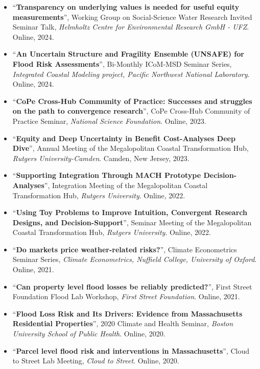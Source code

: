 \documentclass[10pt,oneside]{article}
\begin{document}
\begin{itemize}[label={}]
  \item \enquote{\textbf{Transparency on underlying values is needed for useful equity measurements}}, Working Group on Social-Science Water Research Invited Seminar Talk,  \textit{Helmholtz Centre for Environmental Research GmbH - UFZ}. Online, 2024.
  
  \item \enquote{\textbf{An Uncertain Structure and Fragility Ensemble (UNSAFE) for Flood Risk Assessments}}, Bi-Monthly ICoM-MSD Seminar Series,  \textit{Integrated Coastal Modeling project, Pacific Northwest National Laboratory}. Online, 2024.
  
  \item \enquote{\textbf{CoPe Cross-Hub Community of Practice: Successes and struggles on the path to convergence research}}, CoPe Cross-Hub Community of Practice Seminar,  \textit{National Science Foundation}. Online, 2023.
  
  \item \enquote{\textbf{Equity and Deep Uncertainty in Benefit Cost-Analyses Deep Dive}}, Annual Meeting of the Megalopolitan Coastal Transformation Hub,  \textit{Rutgers University-Camden}. Camden, New Jersey, 2023.
  
  \item \enquote{\textbf{Supporting Integration Through MACH Prototype Decision-Analyses}}, Integration Meeting of the Megalopolitan Coastal Transformation Hub,  \textit{Rutgers University}. Online, 2022.
  
  \item \enquote{\textbf{Using Toy Problems to Improve Intuition, Convergent Research Designs, and Decision-Support}}, Seminar Meeting of the Megalopolitan Coastal Transformation Hub,  \textit{Rutgers University}. Online, 2022.
  
  \item \enquote{\textbf{Do markets price weather-related risks?}}, Climate Econometrics Seminar Series,  \textit{Climate Econometrics, Nuffield College, University of Oxford}. Online, 2021.
  
  \item \enquote{\textbf{Can property level flood losses be reliably predicted?}}, First Street Foundation Flood Lab Workshop,  \textit{First Street Foundation}. Online, 2021.
  
  \item \enquote{\textbf{Flood Loss Risk and Its Drivers: Evidence from Massachusetts Residential Properties}}, 2020 Climate and Health Seminar,  \textit{Boston University School of Public Health}. Online, 2020.
  
  \item \enquote{\textbf{Parcel level flood risk and interventions in Massachusetts}}, Cloud to Street Lab Meeting,  \textit{Cloud to Street}. Online, 2020.
  
\end{itemize}
\end{document}
